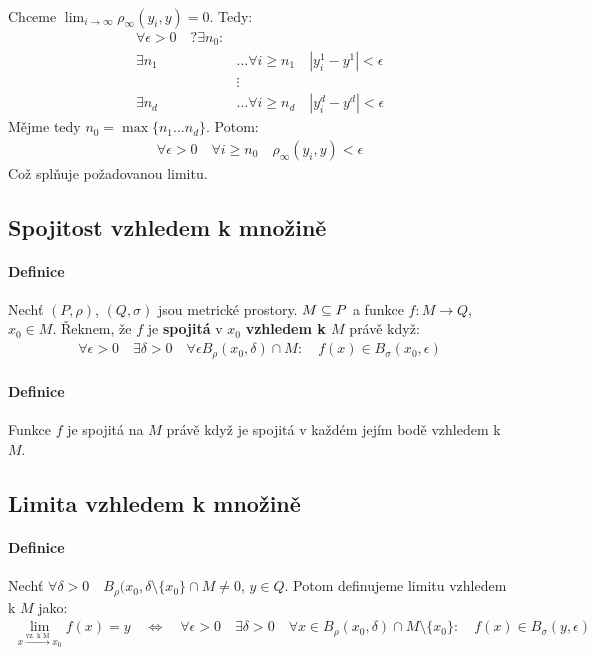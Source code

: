 \documentclass[a4paper,10pt]{article}
\begin{document}
\begin{description}
\begin{align}
	\end{align}
	Chceme $\lim_{i\to\infty} \rho_\infty (y_i, y) = 0$. Tedy:
	\begin{align}
		\forall \epsilon>0 \quad ?\exists n_0: \\
		\exists n_1 &... \forall i \ge n_1 \quad |y_i^1 - y^1| < \epsilon \\
		&\vdots \\
		\exists n_d &... \forall i \ge n_d \quad |y_i^d - y^d| < \epsilon
	\end{align}
	Mějme tedy $n_0 = \max \{ n_1 ... n_d \}$. Potom:
	\begin{align}
		\forall \epsilon > 0 \quad \forall i \ge n_0 \quad \rho_\infty (y_i, y)
		< \epsilon
	\end{align}
	Což splňuje požadovanou limitu.
\end{description}

\subsection{Spojitost vzhledem k množině}
\setcounter{equation}{0}
\paragraph{Definice}
Nechť $(P, \rho)$, $(Q, \sigma)$ jsou metrické prostory. $M \subseteq P$ a funkce $f: M\to
Q$, $x_0 \in M$. Řeknem, že $f$ je \textbf{spojitá} v $x_0$ \textbf{vzhledem k $M$}
právě když:
\begin{align*}
	\forall \epsilon > 0 \quad \exists \delta > 0 \quad \forall \epsilon
	B_\rho(x_0, \delta) \cap M: \quad f(x) \in B_\sigma(x_0, \epsilon)
\end{align*}
\paragraph{Definice}
Funkce $f$ je spojitá na $M$ právě když je spojitá v každém jejím bodě vzhledem
k $M$.

\subsection{Limita vzhledem k množině}
\setcounter{equation}{0}
\paragraph{Definice}
Nechť $\forall \delta > 0 \quad B_\rho(x_0, \delta \setminus \{x_0\} \cap M \neq
0$, $y \in Q$. Potom definujeme limitu vzhledem k $M$ jako:
\begin{align*}
	\lim_{x \xrightarrow{\text{vz. k M}} x_0} f(x) = y \quad \Leftrightarrow \quad 
	\forall \epsilon> 0 \quad \exists \delta >0 \quad \forall x \in B_\rho(x_0,
	\delta) \cap M \setminus \{x_0\}: \quad f(x) \in B_\sigma(y, \epsilon)
\end{align*}
\end{document}
